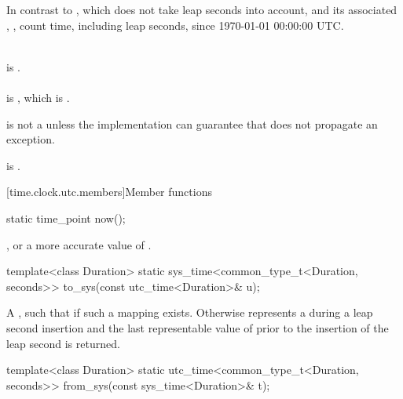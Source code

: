 \pnum
In contrast to ,
which does not take leap seconds into account,
 and its associated , ,
count time, including leap seconds, since 1970-01-01 00:00:00 UTC.
\begin{example}
\\
 is . \\
 \\
is , which is . \\
\end{example}

\pnum
{} is not a 
unless the implementation can guarantee that 
does not propagate an exception.
\begin{note}
 is .
\end{note}

[time.clock.utc.members]{Member functions}

%
\begin{itemdecl}
static time_point now();
\end{itemdecl}

\begin{itemdescr}
\pnum
\returns
{}, or a more accurate value of .
\end{itemdescr}

%
\begin{itemdecl}
template<class Duration>
  static sys_time<common_type_t<Duration, seconds>>
    to_sys(const utc_time<Duration>& u);
\end{itemdecl}

\begin{itemdescr}
\pnum
\returns
A  ,
such that  if such a mapping exists.
Otherwise  represents a 
during a leap second insertion
and the last representable value of 
prior to the insertion of the leap second is returned.
\end{itemdescr}

%
\begin{itemdecl}
template<class Duration>
  static utc_time<common_type_t<Duration, seconds>>
    from_sys(const sys_time<Duration>& t);
\end{itemdecl}

